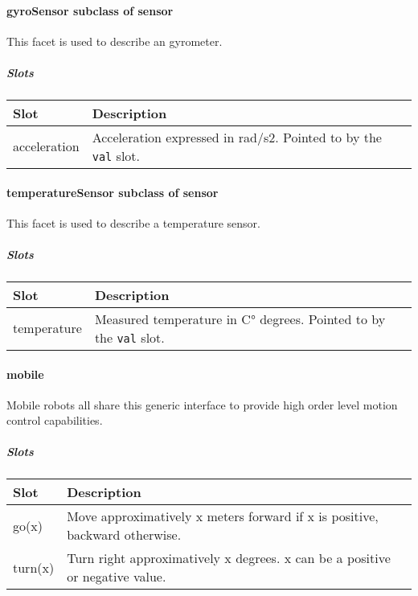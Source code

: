 \documentclass[a4paper]{article}
\begin{document}
\paragraph{gyroSensor  \textmd{subclass of sensor}}

{\sffamily
This facet is used to describe an gyrometer.}

\subparagraph{Slots}

\begin{flushleft}
\tablehead{}
\begin{supertabular}{|m{3.651cm}|m{11.639cm}|}
\hline
\sffamily\bfseries Slot &
\sffamily\bfseries Description\\\hline
acceleration &
\sffamily Acceleration expressed in rad/s2.
Pointed to by the \texttt{val} slot.\\\hline
\end{supertabular}
\end{flushleft}
\paragraph{ temperatureSensor  \textmd{subclass of sensor}}

{\sffamily
This facet is used to describe a temperature sensor.}

\subparagraph{Slots}

\begin{flushleft}
\tablehead{}
\begin{supertabular}{|m{2.98cm}|m{12.31cm}|}
\hline
\sffamily\bfseries Slot &
\sffamily\bfseries Description\\\hline
temperature &
\sffamily Measured temperature in C° degrees.
Pointed to by the \texttt{val} slot.\\\hline
\end{supertabular}
\end{flushleft}
\paragraph{mobile}

{\sffamily
Mobile robots all share this generic interface to provide high order
level motion control capabilities.}

\subparagraph{Slots}

\begin{flushleft}
\tablehead{}
\begin{supertabular}{|m{3.293cm}|m{11.997cm}|}
\hline
\sffamily\bfseries Slot &
\sffamily\bfseries Description\\\hline
go(x) &
\sffamily Move approximatively x meters forward
if x is positive, backward otherwise.\\\hline
turn(x) &
\sffamily Turn right approximatively x degrees.
x can be a positive or negative value.\\\hline
\end{supertabular}
\end{flushleft}
\end{document}
